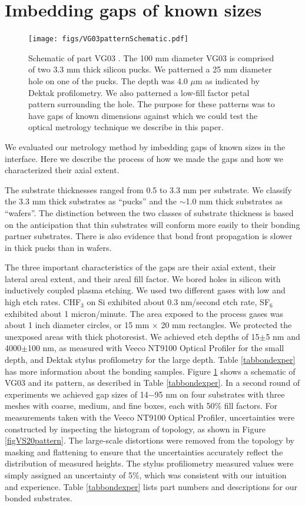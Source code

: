 \documentclass[osajnl,preprint,showpacs,superscriptaddress,12pt]{revtex4-1} %
\begin{document}
\section{Imbedding gaps of known sizes}

\begin{figure}[htbp]
\centerline{\texttt{[image: figs/VG03patternSchematic.pdf]}}
\caption{Schematic of part VG03 \label{figVG03pattern}.  The 100 mm diameter VG03 is comprised of two 3.3 mm thick silicon pucks.  We patterned a 25 mm diameter hole on one of the pucks.  The depth was 4.0 $\mu$m as indicated by Dektak profilometry.  We also patterned a low-fill factor petal pattern surrounding the hole.  The purpose for these patterns was to have gaps of known dimensions against which we could test the optical metrology technique we describe in this paper.}
\end{figure}

We evaluated our metrology method by imbedding gaps of known sizes in the interface.  Here we describe the process of how we made the gaps and how we characterized their axial extent.  

The substrate thicknesses ranged from 0.5 to 3.3 mm per substrate.  We classify the 3.3 mm thick substrates as ``pucks'' and the $\sim$1.0 mm thick substrates as ``wafers''.  The distinction between the two classes of substrate thickness is based on the anticipation that thin substrates will conform more easily to their bonding partner substrates.  There is also evidence that bond front propagation is slower in thick pucks \cite{2007ApOpt..46.6793H} than in wafers.  

The three important characteristics of the gaps are their axial extent, their lateral areal extent, and their areal fill factor.  We bored holes in silicon with inductively coupled plasma etching.  We used two different gases with low and high etch rates.  CHF$_3$ on Si exhibited about 0.3 nm/second etch rate, SF$_6$ exhibited about 1 micron/minute.  The area exposed to the process gases was about 1 inch diameter circles, or 15 mm $\times$ 20 mm rectangles.  We protected the unexposed areas with thick photoresist.  We achieved etch depths of 15$\pm$5 nm and 4000$\pm$100 nm, as measured with Veeco NT9100 Optical Profiler for the small depth, and Dektak stylus profilometry for the large depth.  Table \ref{tabbondexper} has more information about the bonding samples.  Figure \ref{figVG03pattern} shows a schematic of VG03 and its pattern, as described in Table \ref{tabbondexper}.  In a second round of experiments we achieved gap sizes of 14$-$95 nm on four substrates with three meshes with coarse, medium, and fine boxes, each with 50\% fill factors.  For measurements taken with the Veeco NT9100 Optical Profiler, uncertainties were constructed by inspecting the histogram of topology, as shown in Figure \ref{figVS20pattern}.  The large-scale distortions were removed from the topology by masking and flattening to ensure that the uncertainties accurately reflect the distribution of measured heights.  The stylus profiliometry measured values were simply assigned an uncertainty of 5\%, which was consistent with our intuition and experience.  Table \ref{tabbondexper} lists part numbers and descriptions for our bonded substrates.
\end{document}
